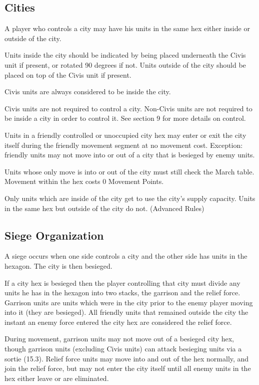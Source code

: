 \subsection{Cities}

A player who controls a city may have his units in the same hex either inside or outside of the city.

Units inside the city should be indicated by being placed underneath the Civis unit if present, or rotated 90 degrees if not. Units outside of the city should be placed on top of the Civis unit if present.

Civis units are always considered to be inside the city.

Civis units are not required to control a city. Non-Civis units are not required to be inside a city in order to control it. See section 9 for more details on control.

Units in a friendly controlled or unoccupied city hex may enter or exit the city itself during the friendly movement segment at no movement cost. Exception: friendly units may not move into or out of a city that is besieged by enemy units.

Units whose only move is into or out of the city must still check the March table. Movement within the hex costs 0 Movement Points.

Only units which are inside of the city get to use the city's supply capacity. Units in the same hex but outside of the city do not. (Advanced Rules)

\subsection{Siege Organization}

A siege occurs when one side controls a city and the other side has units in the hexagon. The city is then besieged.

If a city hex is besieged then the player controlling that city must divide any units he has in the hexagon into two stacks, the garrison and the relief force. Garrison units are units which were in the city prior to the enemy player moving into it (they are besieged). All friendly units that remained outside the city the instant an enemy force entered the city hex are considered the relief force.

During movement, garrison units may not move out of a besieged city hex, though garrison units (excluding Civis units) can attack besieging units via a sortie (15.3). Relief force units may move into and out of the hex normally, and join the relief force, but may not enter the city itself until all enemy units in the hex either leave or are eliminated.


